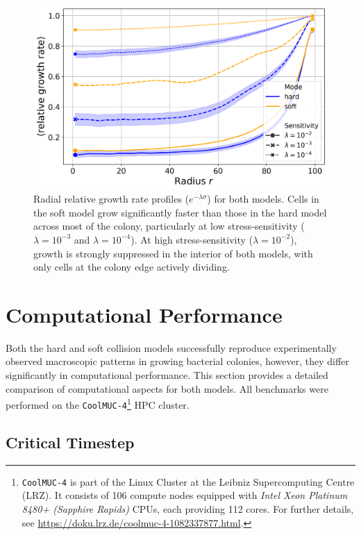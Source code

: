 \documentclass[conference]{IEEEtran}
\begin{document}
\begin{figure}[H]
    \centering
    \includegraphics[width=\linewidth]{figures/comparison_plots/combined_radial_impedance.png}
    \caption{Radial relative growth rate profiles ($e^{-\lambda \sigma}$) for both models. Cells in the soft model grow significantly faster than those in the hard model across most of the colony, particularly at low stress-sensitivity ($\lambda = 10^{-3}$ and $\lambda = 10^{-4}$). At high stress-sensitivity ($\lambda = 10^{-2}$), growth is strongly suppressed in the interior of both models, with only cells at the colony edge actively dividing.}
    \label{fig:radial_distribution_growth_rate}
\end{figure}


\section{Computational Performance}
\label{sec:performance_analysis}

Both the hard and soft collision models successfully reproduce experimentally observed macroscopic patterns in growing bacterial colonies, however, they differ significantly in computational performance. This section provides a detailed comparison of computational aspects for both models. All benchmarks were performed on the \texttt{CoolMUC-4}\footnote{\texttt{CoolMUC-4} is part of the Linux Cluster at the Leibniz Supercomputing Centre (LRZ). It consists of 106 compute nodes equipped with \textit{Intel Xeon Platinum 8480+ (Sapphire Rapids)} CPUs, each providing 112 cores. For further details, see \url{https://doku.lrz.de/coolmuc-4-1082337877.html}.} HPC cluster.

\subsection{Critical Timestep}
\end{document}
